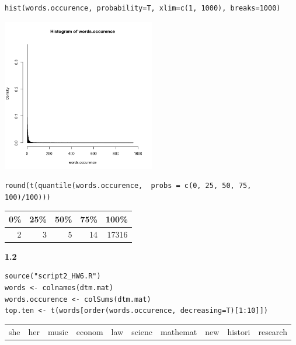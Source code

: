 \documentclass[11pt]{article}
\begin{document}
\begin{verbatim}
hist(words.occurence, probability=T, xlim=c(1, 1000), breaks=1000)
\end{verbatim}

\begin{org}
\begin{center}
\includegraphics[width=0.5\textwidth]{img/hist.png}
\end{center}
\end{org}





\begin{verbatim}
round(t(quantile(words.occurence,  probs = c(0, 25, 50, 75, 100)/100)))
\end{verbatim}

\begin{org}
\begin{center}
\begin{tabular}{rrrrr}
0\% & 25\% & 50\% & 75\% & 100\%\\
\hline
2 & 3 & 5 & 14 & 17316\\
\end{tabular}
\end{center}
\end{org}




\textbf{1.2}

\begin{verbatim}
source("script2_HW6.R")
words <- colnames(dtm.mat)
words.occurence <- colSums(dtm.mat)
top.ten <- t(words[order(words.occurence, decreasing=T)[1:10]])
\end{verbatim}

\begin{org}
\begin{center}
\begin{tabular}{llllllllll}
she & her & music & econom & law & scienc & mathemat & new & histori & research\\
\end{tabular}
\end{center}
\end{org}
\end{document}
